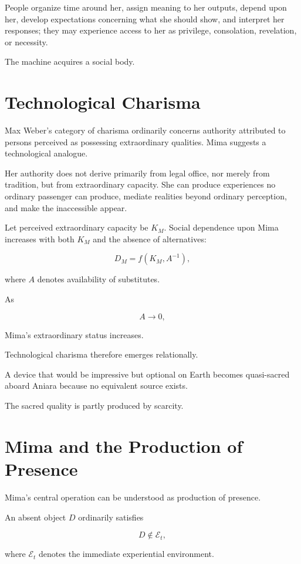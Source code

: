 \documentclass[11pt,oneside]{book}
\theoremstyle{definition}
\theoremstyle{remark}
\begin{document}
People organize time around her, assign meaning to her outputs, depend upon her, develop expectations concerning what she should show, and interpret her responses; they may experience access to her as privilege, consolation, revelation, or necessity.

The machine acquires a social body.

\section{Technological Charisma}

Max Weber's category of charisma ordinarily concerns authority attributed to persons perceived as possessing extraordinary qualities. Mima suggests a technological analogue.

Her authority does not derive primarily from legal office, nor merely from tradition, but from extraordinary capacity. She can produce experiences no ordinary passenger can produce, mediate realities beyond ordinary perception, and make the inaccessible appear.

Let perceived extraordinary capacity be \(K_M\). Social dependence upon Mima increases with both \(K_M\) and the absence of alternatives:

\[
D_M
=
f(K_M,A^{-1}),
\]

where \(A\) denotes availability of substitutes.

As

\[
A\rightarrow0,
\]

Mima's extraordinary status increases.

Technological charisma therefore emerges relationally.

A device that would be impressive but optional on Earth becomes quasi-sacred aboard Aniara because no equivalent source exists.

The sacred quality is partly produced by scarcity.

\section{Mima and the Production of Presence}

Mima's central operation can be understood as production of presence.

An absent object \(D\) ordinarily satisfies

\[
D\notin\mathcal E_t,
\]

where \(\mathcal E_t\) denotes the immediate experiential environment.
\end{document}
